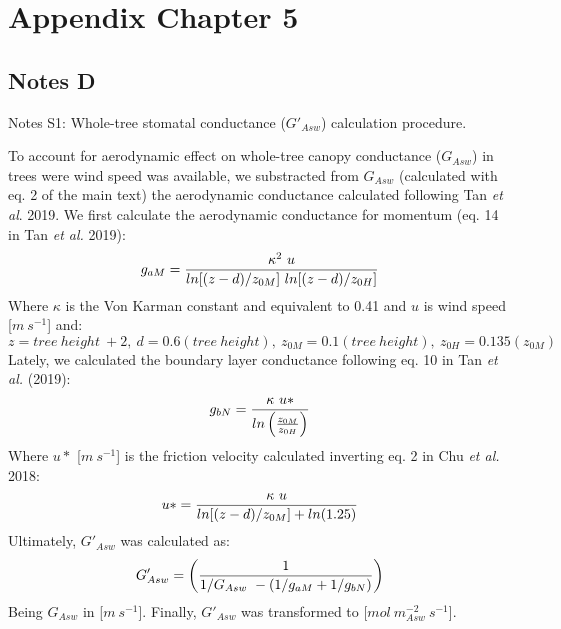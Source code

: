 \documentclass[11pt,twoside]{reedthesis}
\begin{document}
\chapter{Appendix Chapter 5}\label{appendix-chapter-5}

\newpage

\section{Notes D}\label{notes-d}

\normalsize

Notes S1: Whole-tree stomatal conductance (\(G'_{Asw}\)) calculation
procedure.

To account for aerodynamic effect on whole-tree canopy conductance
(\(G_{Asw}\)) in trees were wind speed was available, we substracted
from \(G_{Asw}\) (calculated with eq. 2 of the main text) the
aerodynamic conductance calculated following Tan \emph{et al}. 2019. We
first calculate the aerodynamic conductance for momentum (eq. 14 in Tan
\emph{et al.} 2019):
\begin{equation}
g_{aM} = {{\kappa^{2}\ u} \over{ln[(z-d)/z_{0M}]\ ln[(z-d)/z_{0H}]}}
\end{equation}
Where \(\kappa\) is the Von Karman constant and equivalent to 0.41 and
\(u\) is wind speed {[}\(m\ s^{-1}\){]} and:
\begin{equation}
z = tree\ height\ + 2,\ d = 0.6(tree\ height),\ z_{0M}= 0.1(tree\ height),\ z_{0H}= 0.135(z_{0M})
\end{equation}
Lately, we calculated the boundary layer conductance following eq. 10 in
Tan \emph{et al.} (2019):
\begin{equation}
g_{bN} = {{\kappa\ u*} \over {ln\left({z_{0M}} \over {z_{0H}}\right)}}
\end{equation}
Where \(u*\) {[}\(m\ s^{-1}\){]} is the friction velocity calculated
inverting eq. 2 in Chu \emph{et al.} 2018:
\begin{equation}
u* = {\kappa \ u \over {ln[(z-d)/z_{0M}] + ln(1.25)}}
\end{equation}
Ultimately, \(G'_{Asw}\) was calculated as:
\begin{equation}
G'_{Asw}= \left({1 \over 1/G_{Asw} \ - (1/g_{aM} + 1/g_{bN})}\right)
\end{equation}
Being \(G_{Asw}\) in {[}\(m \ s^{-1}\){]}. Finally, \(G'_{Asw}\) was
transformed to {[}\(mol \ m^{-2}_{Asw} \ s^{-1}\){]}.

\newpage
\end{document}
